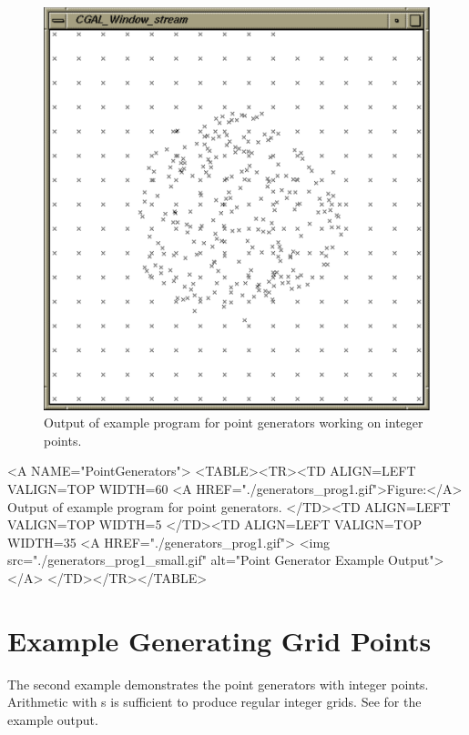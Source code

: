 \begin{ccTexOnly}
\begin{figure}
\begin{minipage}{0.45\textwidth}
      \includegraphics[width=\textwidth]{Generator/generators_prog2}
      \caption{Output of example program for point generators working
        on integer points.}
      \label{figureIntegerPointGenerator}
    \end{minipage}%
  \end{figure}
\end{ccTexOnly}

\begin{ccHtmlOnly}
  <A NAME="PointGenerators">
  <TABLE><TR><TD ALIGN=LEFT VALIGN=TOP WIDTH=60%
    <A HREF="./generators_prog1.gif">Figure:</A>
    Output of example program for point generators.
  </TD><TD ALIGN=LEFT VALIGN=TOP WIDTH=5%
  </TD><TD ALIGN=LEFT VALIGN=TOP WIDTH=35%
    <A HREF="./generators_prog1.gif">
        <img src="./generators_prog1_small.gif" 
             alt="Point Generator Example Output"></A>
  </TD></TR></TABLE>
\end{ccHtmlOnly}

\section{Example Generating Grid Points}

The second example demonstrates the point generators with integer
points. Arithmetic with s is sufficient to produce
regular integer grids. See 
for the example output.

